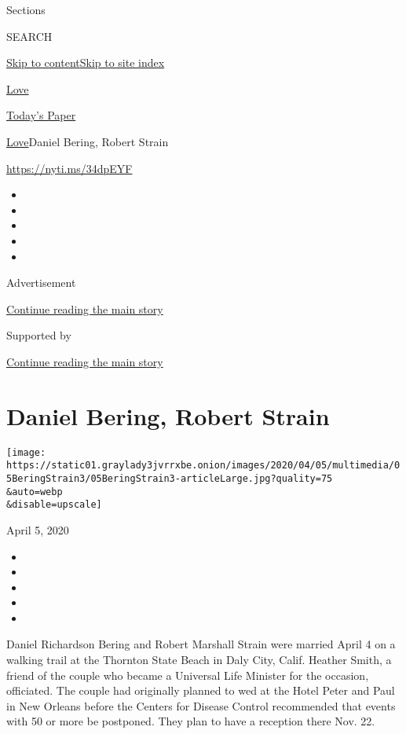 Sections

SEARCH

\protect\hyperlink{site-content}{Skip to
content}\protect\hyperlink{site-index}{Skip to site index}

\href{https://www.nytimes3xbfgragh.onion/section/fashion/weddings}{Love}

\href{https://myaccount.nytimes3xbfgragh.onion/auth/login?response_type=cookie\&client_id=vi}{}

\href{https://www.nytimes3xbfgragh.onion/section/todayspaper}{Today's
Paper}

\href{/section/fashion/weddings}{Love}\textbar{}Daniel Bering, Robert
Strain

\url{https://nyti.ms/34dpEYF}

\begin{itemize}
\item
\item
\item
\item
\item
\end{itemize}

Advertisement

\protect\hyperlink{after-top}{Continue reading the main story}

Supported by

\protect\hyperlink{after-sponsor}{Continue reading the main story}

\hypertarget{daniel-bering-robert-strain}{%
\section{Daniel Bering, Robert
Strain}\label{daniel-bering-robert-strain}}

\texttt{[image: https://static01.graylady3jvrrxbe.onion/images/2020/04/05/multimedia/05BeringStrain3/05BeringStrain3-articleLarge.jpg?quality=75\\\&auto=webp\\\&disable=upscale]}

April 5, 2020

\begin{itemize}
\item
\item
\item
\item
\item
\end{itemize}

Daniel Richardson Bering and Robert Marshall Strain were married April 4
on a walking trail at the Thornton State Beach in Daly City, Calif.
Heather Smith, a friend of the couple who became a Universal Life
Minister for the occasion, officiated. The couple had originally planned
to wed at the Hotel Peter and Paul in New Orleans before the Centers for
Disease Control recommended that events with 50 or more be postponed.
They plan to have a reception there Nov. 22.


